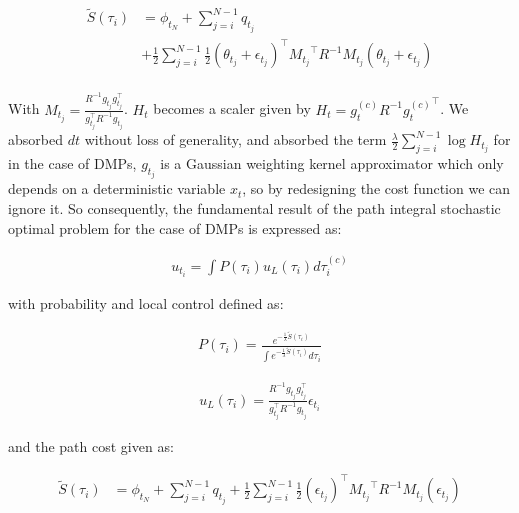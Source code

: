 \documentclass[journal]{IEEEtran}
\begin{document}
\begin{equation}
  \begin{aligned}
    \tilde{S}(\tau_i)& = \phi_{t_N}+\sum_{j=i}^{N-1}q_{t_j} \\ & + \frac{1}{2}\sum_{j=i}^{N-1}  \frac{1}{2}(\theta_{t_j} + \epsilon_{t_j})^{\top}{M_{t_j}}^{\top}{R}^{-1}{M_{t_j}} (\theta_{t_j} + \epsilon_{t_j})\\ 
  \end{aligned}
\end{equation}

With $M_{t_j} = \frac{R^{-1}g_{t_j}g_{t_j}^{\top}}{g_{t_j}^{\top}R^{-1}g_{t_j}}$. $H_t$ becomes a scaler given by $H_t = {g_{t}^{(c)}}R^{-1}{g_{t}^{(c)}}^{\top}$. 
We absorbed $dt$ without loss of generality, and absorbed the term $\frac{\lambda}{2} \sum_{j = i}^{N-1} \log H_{t_j}$ for in the case of DMPs, $g_{t_j}$ is a Gaussian weighting kernel approximator which 
only depends on a deterministic variable $x_t$, so by redesigning the cost function we can ignore it. So consequently, the fundamental result of the path integral stochastic optimal problem for the case of DMPs is expressed as:


\begin{equation}
  \begin{aligned}
   u_{t_i} = \int P(\tau_i) u_L(\tau_i) d\tau_i^{(c)}  
  \end{aligned}
\end{equation}

with probability and local control defined as:


\begin{equation}
  \begin{aligned}
   P(\tau_i) = \frac{e^{-\frac{1}{\lambda}\tilde{S}(\tau_i)}  }{\int e^{-\frac{1}{\lambda}\tilde{S}(\tau_i)}d\tau_i} \nonumber 
  \end{aligned}
\end{equation}

\begin{equation}
  \begin{aligned}
    u_L(\tau_i) = \frac{R^{-1}g_{t_j}g_{t_j}^{\top}}{g_{t_j}^{\top}R^{-1}g_{t_j}} \epsilon_{t_i} \nonumber
  \end{aligned}
\end{equation}


and the path cost given as:

\begin{equation}
  \begin{aligned}
    \tilde{S}(\tau_i)& = \phi_{t_N}+\sum_{j=i}^{N-1}q_{t_j}  + \frac{1}{2}\sum_{j=i}^{N-1}  \frac{1}{2}( \epsilon_{t_j})^{\top}{M_{t_j}}^{\top}{R}^{-1}{M_{t_j}} ( \epsilon_{t_j})\\ 
   \end{aligned}
\end{equation}
\end{document}
